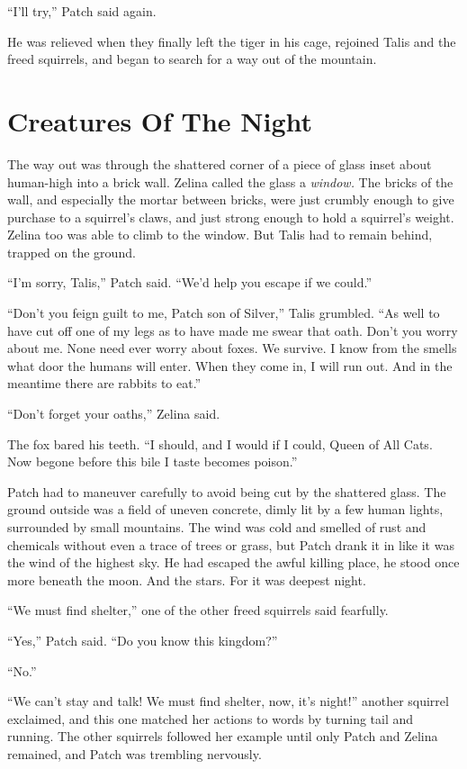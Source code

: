 \documentclass[12pt]{memoir}
\begin{document}
“I’ll try,” Patch said again.

He was relieved when they finally left the tiger in his cage, rejoined
Talis and the freed squirrels, and began to search for a way out of
the mountain.


\section{Creatures Of The Night}

The way out was through the shattered corner of a piece of glass inset
about human-high into a brick wall. Zelina called the glass a
\textit{window.} The bricks of the wall, and especially the mortar
between bricks, were just crumbly enough to give purchase to a
squirrel’s claws, and just strong enough to hold a squirrel’s
weight. Zelina too was able to climb to the window. But Talis had to
remain behind, trapped on the ground.

“I’m sorry, Talis,” Patch said. “We’d help you escape if we could.”

“Don’t you feign guilt to me, Patch son of Silver,” Talis
grumbled. “As well to have cut off one of my legs as to have made me
swear that oath. Don’t you worry about me. None need ever worry about
foxes. We survive. I know from the smells what door the humans will
enter. When they come in, I will run out. And in the meantime there
are rabbits to eat.”

“Don’t forget your oaths,” Zelina said.

The fox bared his teeth. “I should, and I would if I could, Queen of
All Cats. Now begone before this bile I taste becomes poison.”

Patch had to maneuver carefully to avoid being cut by the shattered
glass. The ground outside was a field of uneven concrete, dimly lit by
a few human lights, surrounded by small mountains. The wind was cold
and smelled of rust and chemicals without even a trace of trees or
grass, but Patch drank it in like it was the wind of the highest
sky. He had escaped the awful killing place, he stood once more
beneath the moon. And the stars. For it was deepest night.

“We must find shelter,” one of the other freed squirrels said
fearfully.

“Yes,” Patch said. “Do you know this kingdom?”

“No.”

“We can’t stay and talk! We must find shelter, now, it’s night!”
another squirrel exclaimed, and this one matched her actions to words
by turning tail and running. The other squirrels followed her example
until only Patch and Zelina remained, and Patch was trembling
nervously.
\end{document}
